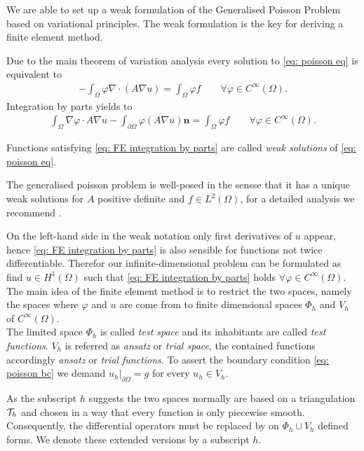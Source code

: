 We are able to set up a weak formulation of the Generalised Poisson Problem based on variational principles. The weak formulation is the key for deriving a finite element method.

Due to the main theorem of variation analysis every solution to \eqref{eq: poisson eq} is equivalent to 
\begin{align}
	-\int_\Omega \varphi \nabla \cdot (A \nabla u) = \int_\Omega \varphi f \qquad \forall \varphi \in C^\infty(\Omega).
\end{align}
Integration by parts yields to
\begin{align}
	\int_\Omega \nabla \varphi  \cdot A\nabla u -\int_{\partial \Omega} \varphi (A\nabla u) \mathbf{n}  = \int_\Omega \varphi f \qquad \forall \varphi \in C^\infty(\Omega). \label{eq: FE integration by parts}
\end{align}
\begin{definition}
	Functions satisfying \eqref{eq: FE integration by parts} are called \emph{weak solutions} of \eqref{eq: poisson eq}.
\end{definition}
The generalised poisson problem is well-posed in the sensse that it has a unique weak solutions for $A$ positive definite and $f\in L^2(\Omega)$, for a detailed analysis we recommend \cite[Chapter~6]{Evans1998}.

On the left-hand side in the weak notation only first derivatives of $u$ appear, hence \eqref{eq: FE integration by parts}  is also sensible for functions not twice differentiable. Therefor our infinite-dimensional problem can be formulated as find $u\in H^1(\Omega)$ such that  \eqref{eq: FE integration by parts}  holds $\forall \varphi \in C^\infty(\Omega)$.
The main idea of the finite element method is to restrict the two spaces, namely the spaces where $\varphi$ and $u$ are come from to finite dimensional spaces $\Phi_h$ and $V_h$ of $C^\infty(\Omega)$.\\
The limited space $\Phi_h$ is called \emph{test space} and its inhabitants are called \emph{test functions}. $V_h$ is referred as \emph{ansatz} or \emph{trial space},  the contained functions accordingly \emph{ansatz} or \emph{trial functions}. To assert the boundary condition \eqref{eq: poisson bc} we demand $u_h|_{\partial \Omega} = g$ for every $u_h \in V_h$.

As the subscript $h$ suggests the two spaces normally are based on a triangulation $\mathcal{T}_h$ and chosen in a way that every function is only piecewise smooth. Consequently, the differential operators must be replaced by on $\Phi_h \cup V_h$ defined forms. We denote these extended versions by a subscript $h$.

